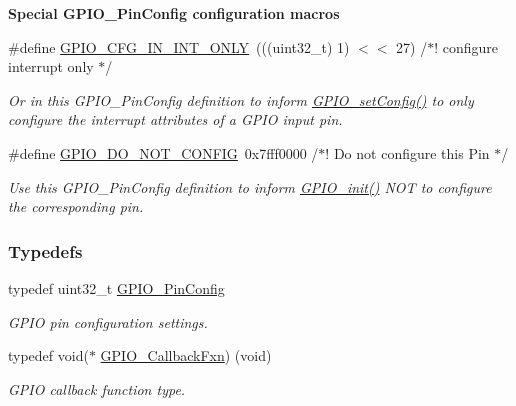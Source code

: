 \begin{Indent}{\bf Special G\+P\+I\+O\+\_\+\+Pin\+Config configuration macros}\par
\begin{DoxyCompactItemize}
\item 
\#define \hyperlink{_g_p_i_o_8h_ac8df4b49e09cb612275ed7d00e8cc1cf}{G\+P\+I\+O\+\_\+\+C\+F\+G\+\_\+\+I\+N\+\_\+\+I\+N\+T\+\_\+\+O\+N\+L\+Y}~(((uint32\+\_\+t) 1) $<$$<$ 27)                  /$\ast$! configure interrupt only $\ast$/
\begin{DoxyCompactList}\small\item\em \textquotesingle{}Or\textquotesingle{} in this G\+P\+I\+O\+\_\+\+Pin\+Config definition to inform \hyperlink{_g_p_i_o_8h_ae13b9ae70c5d2993d1ac932a91c1f1fa}{G\+P\+I\+O\+\_\+set\+Config()} to only configure the interrupt attributes of a G\+P\+I\+O input pin. \end{DoxyCompactList}\item 
\#define \hyperlink{_g_p_i_o_8h_a0974eb3af57b7bccef9ac749d4cf23a7}{G\+P\+I\+O\+\_\+\+D\+O\+\_\+\+N\+O\+T\+\_\+\+C\+O\+N\+F\+I\+G}~0x7fff0000                              /$\ast$! Do not configure this Pin $\ast$/
\begin{DoxyCompactList}\small\item\em Use this G\+P\+I\+O\+\_\+\+Pin\+Config definition to inform \hyperlink{_g_p_i_o_8h_a7aaec489dca5ac4d278d2eb3ae38a2d2}{G\+P\+I\+O\+\_\+init()} N\+O\+T to configure the corresponding pin. \end{DoxyCompactList}\end{DoxyCompactItemize}
\end{Indent}
\subsubsection*{Typedefs}
\begin{DoxyCompactItemize}
\item 
typedef uint32\+\_\+t \hyperlink{_g_p_i_o_8h_a7f5d979226db633309b3fdc0f4a8aef6}{G\+P\+I\+O\+\_\+\+Pin\+Config}
\begin{DoxyCompactList}\small\item\em G\+P\+I\+O pin configuration settings. \end{DoxyCompactList}\item 
typedef void($\ast$ \hyperlink{_g_p_i_o_8h_a033bc79f1a530381da2b74711e6b8971}{G\+P\+I\+O\+\_\+\+Callback\+Fxn}) (void)
\begin{DoxyCompactList}\small\item\em G\+P\+I\+O callback function type. \end{DoxyCompactList}\end{DoxyCompactItemize}
